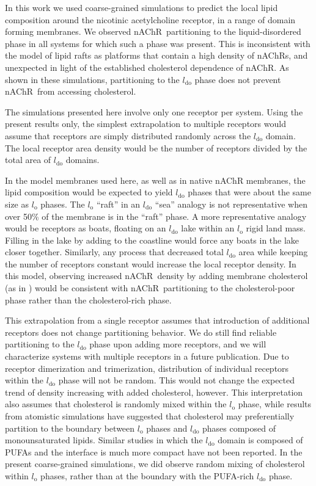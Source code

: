 \documentclass[final,3p,times,twocolumn]{elsarticle}
\newcommand{\lo}{l_{\mathrm{o}}}
\newcommand{\ldo}{l_{\mathrm{do}}}
\newcommand{\nachr}{nAChR}
\begin{document}
In this work we used coarse-grained simulations to predict the local lipid composition around the nicotinic acetylcholine receptor, in a range of domain forming membranes.  We observed  \nachr~partitioning to the liquid-disordered phase in all systems for which such a phase was present.  This is inconsistent with the model of lipid rafts as platforms that contain a high density of nAChRs, and unexpected in light of the established cholesterol dependence of nAChR.  As shown in these simulations, partitioning to the $\ldo$ phase does not prevent \nachr~from accessing cholesterol. 

The simulations presented here involve only one receptor per system.  Using the present results only, the simplest extrapolation to multiple receptors would assume that receptors are simply distributed randomly across the $\ldo$ domain.  The local receptor area density would be the number of receptors divided by the total area of $\ldo$ domains.    

In the model membranes used here, as well as in native nAChR membranes, the lipid composition would be expected to yield $\ldo$ phases that were about the same size as $\lo$ phases. The $\lo$ ``raft'' in an $\ldo$ ``sea'' analogy is not representative when over 50\% of the membrane is in the ``raft'' phase.  A more representative analogy would be receptors as boats, floating on an $\ldo$ lake within an $\lo$ rigid land mass.  Filling in the lake by adding to the coastline would force any boats in the lake closer together.  Similarly, any process that decreased total $\ldo$ area while keeping the number of receptors constant would increase the local receptor density.   In this model, observing increased \nachr~density by adding membrane cholesterol (as in \cite{Barrantes2000,
Barrantes2014,Bruses2001,Marchand2002,Oshikawa2003,Pato2008,Zhu2006, Barrantes2007,Wenz2005,Borroni2016}) would be consistent with \nachr~partitioning to the cholesterol-poor phase rather than the cholesterol-rich phase. 

This extrapolation from a single receptor assumes that introduction of additional receptors does not change partitioning behavior.  We do still find reliable partitioning to the $\ldo$ phase upon adding more receptors, and we will characterize systems with multiple receptors in a future publication. Due to receptor dimerization and trimerization, distribution of individual receptors within the $\ldo$ phase will not be random.   This would not change the expected trend of density increasing with added cholesterol, however.  This interpretation also assumes that cholesterol is randomly mixed within the $\lo$ phase, while results from atomistic simulations\cite{Sodt2014, Iyer2018} have suggested that cholesterol may preferentially partition to the boundary between $\lo$ phases and $\ldo$ phases composed of monounsaturated lipids. Similar studies in which the $\ldo$ domain is composed of PUFAs and the interface is much more compact have not been reported.  In the present coarse-grained simulations, we did observe random mixing of cholesterol within $\lo$ phases, rather than at the boundary with the PUFA-rich $\ldo$ phase.  
\end{document}
